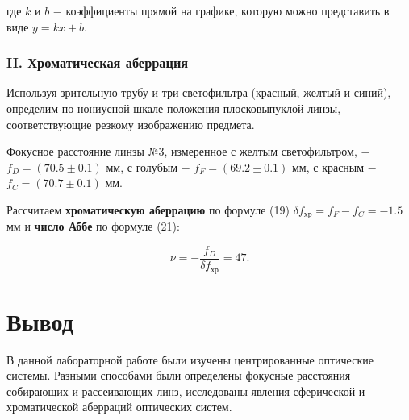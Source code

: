 \documentclass[a4paper,12pt]{article} %
\begin{document}
\hfill \break где $k$ и $b$ $-$ коэффициенты прямой на графике, которую можно представить в виде $y = kx + b$.

\subsubsection*{II. Хроматическая аберрация}
\hfill \break Используя зрительную трубу и три светофильтра (красный, желтый и синий), определим по нониусной шкале положения плосковыпуклой линзы, соответствующие резкому изображению предмета. 

\hfill \break Фокусное расстояние линзы №3, измеренное с желтым светофильтром, $-$ $f_{D} = (70.5 \pm 0.1)$ мм, с голубым $-$ $f_{F} = (69.2 \pm 0.1)$ мм, с красным $-$ $f_{C} = (70.7 \pm 0.1)$ мм.

\hfill \break Рассчитаем \textbf{хроматическую аберрацию} по формуле (19) $\delta f_{\text{хр}} = f_{F} - f_{C} = -1.5$ мм и \textbf{число Аббе} по формуле (21):

$$
\nu = - \frac {f_{D}} {\delta f_{\text{хр}}} = 47.
$$

\section{Вывод}
\hfill \break В данной лабораторной работе были изучены центрированные оптические системы. Разными способами были определены фокусные расстояния собирающих и рассеивающих линз, исследованы явления сферической и хроматической аберраций оптических систем.
\end{document}
